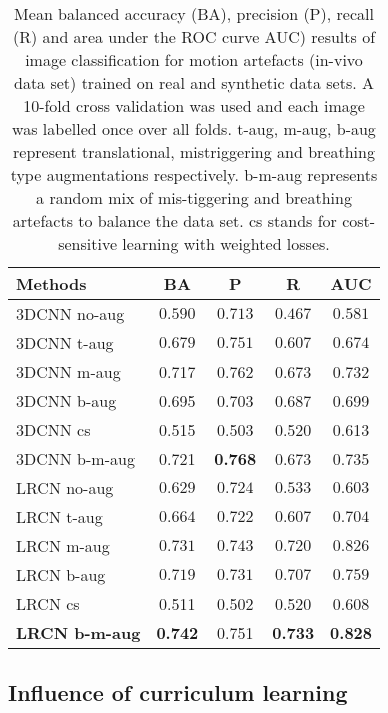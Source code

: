 \documentclass[preprint,12pt,authoryear]{elsarticle}
\begin{document}
\begin{table} 

\centering
\caption{Mean balanced accuracy (BA), precision (P), recall (R) and area under the ROC curve AUC) results of image classification for motion artefacts (in-vivo data set) trained on real and synthetic data sets. A 10-fold cross validation was used and each image was labelled once over all folds. t-aug, m-aug, b-aug represent translational, mistriggering and breathing type augmentations respectively. b-m-aug  represents a random mix of  mis-tiggering and breathing artefacts to balance the data set. cs stands for cost-sensitive learning with weighted losses.}
\begin{tabular}{lcccc}
\hline
Methods   &  BA & P & R & AUC \\
\hline 

3DCNN no-aug    & $0.590 $ & $0.713$  & $0.467$    & $0.581$    \\
3DCNN t-aug     & $ 0.679 $  & $0.751$  & $0.607$  & $0.674$    \\
3DCNN m-aug     &  0.717 & 0.762 & 0.673 & 0.732  \\
3DCNN b-aug     &  0.695 & 0.703 & 0.687 & 0.699  \\  
3DCNN cs        &  0.515 & 0.503 & 0.520& 0.613 \\
3DCNN b-m-aug   &  0.721 & \textbf{0.768} & 0.673 & 0.735    \\
\hline
LRCN no-aug             & $0.629 $ & $0.724$  & $0.533$    & $0.603$    \\
LRCN t-aug              & $0.664 $ & $0.722$  & $0.607$    & $0.704$    \\
LRCN m-aug               &  $ 0.731  $ &   $ 0.743 $  &   $ 0.720 $ &   $0.826$  \\
LRCN b-aug              & $0.719 $ & $0.731$  & $0.707$    & $0.759$     \\
LRCN cs                 &  0.511 & 0.502 & 0.520 & 0.608 \\
\textbf{LRCN b-m-aug}   & \textbf{0.742}  &  0.751 &  \textbf{0.733} &  \textbf{0.828}  \\


\hline
\end{tabular}
\label{table:quan}
\end{table}



\subsection{Influence of curriculum learning}
\label{sec:CurResults}
\end{document}
